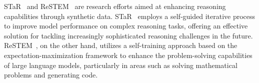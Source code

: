 STaR~\cite{zelikman2024star} and ReSTEM~\cite{singh2023beyond} are research efforts aimed at enhancing reasoning capabilities through synthetic data. STaR~\cite{zelikman2024star} employs a self-guided iterative process to improve model performance on complex reasoning tasks, offering an effective solution for tackling increasingly sophisticated reasoning challenges in the future. ReSTEM~\cite{singh2023beyond}, on the other hand, utilizes a self-training approach based on the expectation-maximization framework to enhance the problem-solving capabilities of large language models, particularly in areas such as solving mathematical problems and generating code.


